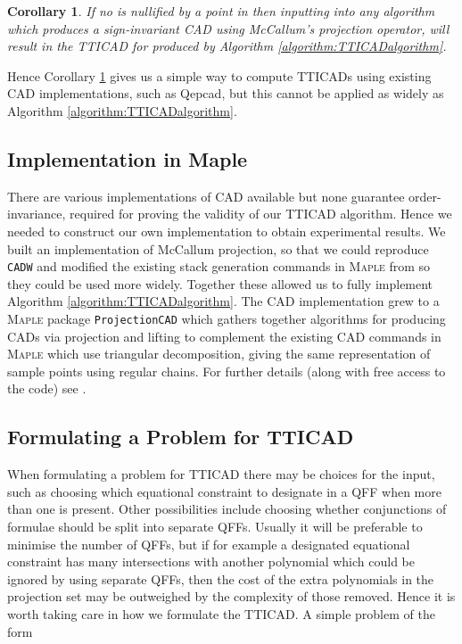 \documentclass{article}
\newtheorem{corollary}[theorem]{Corollary}
\begin{document}
\begin{corollary}\label{corollary:rescad}
If no  is nullified by a point in  then inputting  into any algorithm which produces a sign-invariant CAD using McCallum's projection operator, will result in the TTICAD for  produced by Algorithm \ref{algorithm:TTICADalgorithm}.
\end{corollary}

Hence Corollary \ref{corollary:rescad} gives us a simple way to compute TTICADs using existing CAD implementations, such as {\sc Qepcad}, but this cannot be applied as widely as Algorithm \ref{algorithm:TTICADalgorithm}.

\subsection{Implementation in Maple} 
\label{MapleSec}

There are various implementations of CAD available but none guarantee order-invariance, required for proving the validity of our TTICAD algorithm.  
Hence we needed to construct our own implementation to obtain experimental results.  We built an implementation of McCallum projection, so that we could reproduce {\tt CADW} and modified the existing stack generation commands in \textsc{Maple} from \cite{Chenetal2009d} so they could be used more widely.  Together these allowed us to fully implement Algorithm \ref{algorithm:TTICADalgorithm}.  The CAD implementation grew to a \textsc{Maple} package \texttt{ProjectionCAD} which gathers together algorithms for producing CADs via projection and lifting to complement the existing CAD commands in \textsc{Maple} which use triangular decomposition, giving the same representation of sample points using regular chains.  For further details (along with free access to the code) see \cite{ProjectionCAD}.



\subsection{Formulating a Problem for TTICAD} 
\label{subsection:heuristic}

When formulating a problem for TTICAD there may be choices for the input, such as choosing which equational constraint to designate in a QFF when more than one is present.  Other possibilities include choosing whether conjunctions of formulae should be split into separate QFFs.  Usually it will be preferable to minimise the number of QFFs, but if for example a designated equational constraint has many intersections with another polynomial which could be ignored by using separate QFFs, then the cost of the extra polynomials in the projection set may be outweighed by the complexity of those removed.  
Hence it is worth taking care in how we formulate the TTICAD.  
A simple problem of the form
\end{document}
